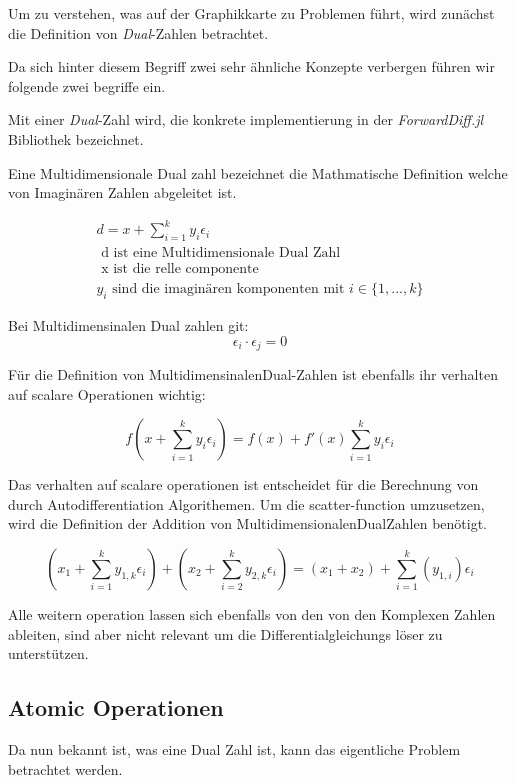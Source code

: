 Um zu verstehen, was auf der Graphikkarte zu Problemen führt, wird zunächst die Definition von \textit{Dual}-Zahlen betrachtet.

Da sich hinter diesem Begriff zwei sehr ähnliche Konzepte verbergen führen wir folgende zwei begriffe ein.

Mit einer \textit{Dual}-Zahl wird, die konkrete implementierung in der \textit{ForwardDiff.jl} Bibliothek bezeichnet.

Eine Multidimensionale Dual zahl bezeichnet die Mathmatische Definition welche von Imaginären Zahlen abgeleitet ist.

\begin{gather*}
 d = x + \sum_{i = 1}^{k} y_i \epsilon_i \\
	\text{ d ist eine Multidimensionale Dual Zahl } \\
	\text{ x ist die relle componente } \\
	y_i \text{ sind die imaginären komponenten mit } i \in \{1, ..., k\}
\end{gather*}

Bei Multidimensinalen Dual zahlen git:
$$
 \epsilon_i \cdot \epsilon_j = 0
$$

Für die Definition von MultidimensinalenDual-Zahlen ist ebenfalls ihr verhalten auf scalare Operationen wichtig:

$$
 f( x + \sum_{i = 1}^{k} y_i \epsilon_i  ) = f(x) +  f'(x) \sum_{i = 1}^{k} y_i \epsilon_i
$$
\cite{juliaForwardDiffPackage}


Das verhalten auf scalare operationen ist entscheidet für die Berechnung von durch Autodifferentiation Algorithemen.
Um die scatter-function umzusetzen, wird die Definition der Addition von MultidimensionalenDualZahlen \cite{RecentAdvances} benötigt.

$$
(x_1 + \sum_{i = 1}^{k} y_{1,k} \epsilon_i) + ( x_2 + \sum_{i = 2}^{k} y_{2,k} \epsilon_i) = (x_1 + x_2) + \sum_{i = 1}^{k} (y_{1, i}) \epsilon_i
$$

Alle weitern operation lassen sich ebenfalls von den von den Komplexen Zahlen ableiten, 
sind aber nicht relevant um die Differentialgleichungs löser zu unterstützen.


\subsection{Atomic Operationen} \label{atomic}

Da nun bekannt ist, was eine Dual Zahl ist, 
kann das eigentliche Problem betrachtet werden.

